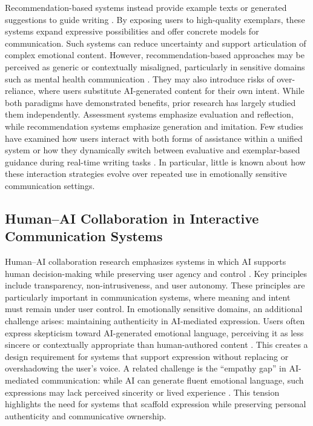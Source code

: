 \documentclass[]{llncs}
\begin{document}
Recommendation-based systems instead provide example texts or generated suggestions to guide writing \cite{Hui2018,Gero2019}. By exposing users to high-quality exemplars, these systems expand expressive possibilities and offer concrete models for communication. Such systems can reduce uncertainty and support articulation of complex emotional content. However, recommendation-based approaches may be perceived as generic or contextually misaligned, particularly in sensitive domains such as mental health communication \cite{Shen2024}. They may also introduce risks of over-reliance, where users substitute AI-generated content for their own intent. While both paradigms have demonstrated benefits, prior research has largely studied them independently. Assessment systems emphasize evaluation and reflection, while recommendation systems emphasize generation and imitation. Few studies have examined how users interact with both forms of assistance within a unified system or how they dynamically switch between evaluative and exemplar-based guidance during real-time writing tasks \cite{Peng2020}. In particular, little is known about how these interaction strategies evolve over repeated use in emotionally sensitive communication settings.

\subsection{Human--AI Collaboration in Interactive Communication Systems}

Human--AI collaboration research emphasizes systems in which AI supports human decision-making while preserving user agency and control \cite{Amershi2019}. Key principles include transparency, non-intrusiveness, and user autonomy. These principles are particularly important in communication systems, where meaning and intent must remain under user control. In emotionally sensitive domains, an additional challenge arises: maintaining authenticity in AI-mediated expression. Users often express skepticism toward AI-generated emotional language, perceiving it as less sincere or contextually appropriate than human-authored content \cite{Jakesch2019}. This creates a design requirement for systems that support expression without replacing or overshadowing the user’s voice. A related challenge is the ``empathy gap'' in AI-mediated communication: while AI can generate fluent emotional language, such expressions may lack perceived sincerity or lived experience \cite{Jakesch2023b}. This tension highlights the need for systems that scaffold expression while preserving personal authenticity and communicative ownership.
\end{document}
